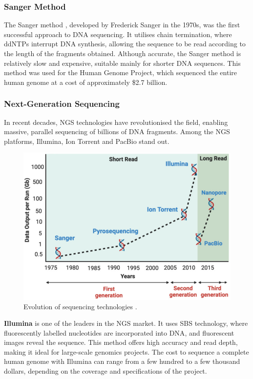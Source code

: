 	\subsubsection{Sanger Method}
	The Sanger method \cite{sanger1977dna}, developed by Frederick Sanger in the 1970s, was the first successful approach to \acs{DNA} sequencing. It utilises chain termination, where \ac{ddNTPs} interrupt \acs{DNA} synthesis, allowing the sequence to be read according to the length of the fragments obtained. Although accurate, the Sanger method is relatively slow and expensive, suitable mainly for shorter \acs{DNA} sequences. This method was used for the Human Genome Project, which sequenced the entire human genome at a cost of approximately \$2.7 billion.
	
	
	\subsubsection{Next-Generation Sequencing}
	In recent decades, \ac{NGS} technologies \cite{shendure2008nextgeneration,satam2023nextgeneration} have revolutionised the field, enabling massive, parallel sequencing of billions of \acs{DNA} fragments. Among the \acs{NGS} platforms, Illumina, Ion Torrent and \acs{PacBio} stand out.
	
	\begin{figure}[!ht]
		\centering
		\includegraphics[width=0.85\linewidth]{images/next-generation_sequencing_technology}
		\caption[Evolution of sequencing technologies]{Evolution of sequencing technologies \cite{satam2023nextgeneration}.}
		\label{fig:evolution-sequencing-technologies}
	\end{figure}

	\textbf{Illumina} is one of the leaders in the \acs{NGS} market. It uses \ac{SBS} technology, where fluorescently labelled nucleotides are incorporated into \acs{DNA}, and fluorescent images reveal the sequence. This method offers high accuracy and read depth, making it ideal for large-scale genomics projects. The cost to sequence a complete human genome with Illumina can range from a few hundred to a few thousand dollars, depending on the coverage and specifications of the project.
	
